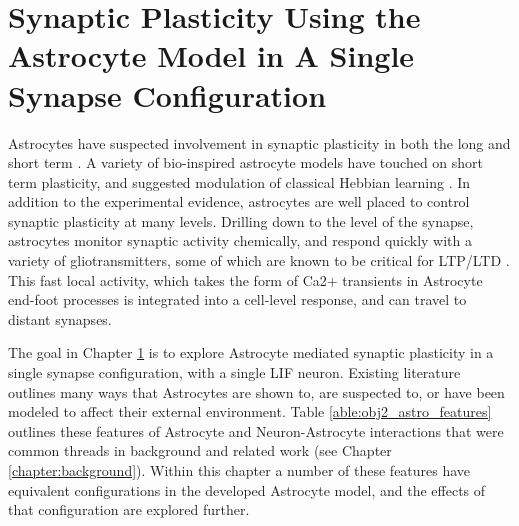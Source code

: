 \chapter{Synaptic Plasticity Using the Astrocyte Model in A Single Synapse
  Configuration} \label{chapter:obj2}

Astrocytes have suspected involvement in synaptic plasticity in both the
long \cite{min_2012} and short term \cite{pitta_2012}. A variety of
bio-inspired astrocyte models have touched on short term plasticity, and
suggested modulation of classical Hebbian learning \cite{pitta_2016}. In
addition to the experimental evidence, astrocytes are well placed to control
synaptic plasticity at many levels. Drilling down to the level of the
synapse, astrocytes monitor synaptic activity chemically, and respond
quickly with a variety of gliotransmitters, some of which are known to be
critical for LTP/LTD \cite{min_2012}. This fast local activity, which takes
the form of Ca2+ transients in Astrocyte end-foot processes is integrated
into a cell-level response, and can travel to distant synapses.

The goal in Chapter \ref{chapter:obj2} is to explore Astrocyte mediated synaptic
plasticity in a single synapse configuration, with a single LIF neuron. Existing
literature outlines many ways that Astrocytes are shown to, are suspected to, or
have been modeled to affect their external environment. Table
\ref{able:obj2_astro_features} outlines these features of Astrocyte and
Neuron-Astrocyte interactions that were common threads in background and related 
work (see Chapter \ref{chapter:background}). Within this chapter a number of
these features have equivalent configurations in the developed Astrocyte model,
and the effects of that configuration are explored further.

